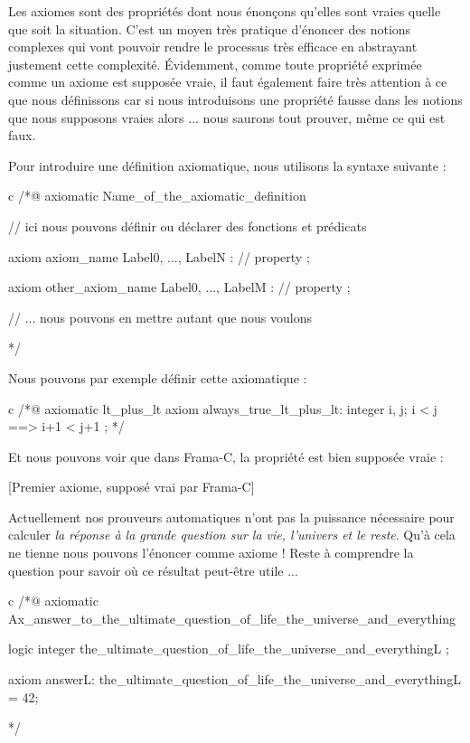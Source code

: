 
Les axiomes sont des propriétés dont nous énonçons qu'elles sont vraies quelle 
que soit la situation. C'est un moyen très pratique d'énoncer des notions 
complexes qui vont pouvoir rendre le processus très efficace en abstrayant 
justement cette complexité. Évidemment, comme toute propriété exprimée comme un
axiome est supposée vraie, il faut également faire très attention à ce que nous
définissons car si nous introduisons une propriété fausse dans les notions que 
nous supposons vraies alors ... nous saurons tout prouver, même ce qui est faux.





Pour introduire une définition axiomatique, nous utilisons la syntaxe suivante :



\begin{CodeBlock}{c}
/*@
  axiomatic Name_of_the_axiomatic_definition {
    // ici nous pouvons définir ou déclarer des fonctions et prédicats

    axiom axiom_name { Label0, ..., LabelN }:
      // property ;

    axiom other_axiom_name { Label0, ..., LabelM }:
      // property ;

    // ... nous pouvons en mettre autant que nous voulons
  }
*/
\end{CodeBlock}



Nous pouvons par exemple définir cette axiomatique :



\begin{CodeBlock}{c}
/*@
  axiomatic lt_plus_lt{
    axiom always_true_lt_plus_lt:
      \forall integer i, j; i < j ==> i+1 < j+1 ;
  }
*/
\end{CodeBlock}



Et nous pouvons voir que dans Frama-C, la propriété est bien supposée vraie :



[Premier axiome, supposé vrai par Frama-C]


\begin{Spoiler}
Actuellement nos prouveurs automatiques n'ont pas la puissance nécessaire
pour calculer \textit{la réponse à la grande question sur la vie, l'univers et le 
reste}. Qu'à cela ne tienne nous pouvons l'énoncer comme axiome ! Reste à
comprendre la question pour savoir où ce résultat peut-être utile ...

\begin{CodeBlock}{c}
/*@
  axiomatic Ax_answer_to_the_ultimate_question_of_life_the_universe_and_everything {
    logic integer the_ultimate_question_of_life_the_universe_and_everything{L} ;

    axiom answer{L}:
      the_ultimate_question_of_life_the_universe_and_everything{L} = 42;
  }
*/
\end{CodeBlock}
\end{Spoiler}


